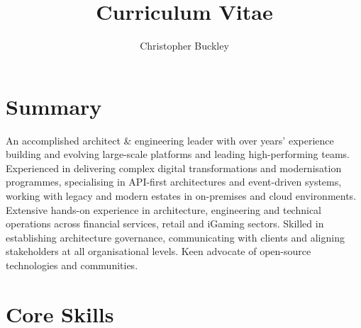 \documentclass{cv}
\title{Curriculum Vitae}
\author{Christopher Buckley}
\begin{document}

\section{Summary}

An accomplished architect \& engineering leader with over  years' experience
building and evolving large-scale platforms and leading high-performing teams. Experienced in
delivering complex digital transformations and modernisation programmes, specialising in API-first
architectures and event-driven systems, working with legacy and modern estates in on-premises and cloud
environments. Extensive hands-on experience in architecture, engineering and technical operations across
financial services, retail and iGaming sectors. Skilled in establishing architecture governance,
communicating with clients and aligning stakeholders at all organisational levels. Keen advocate of
open-source technologies and communities.


\section{Core Skills}
\end{document}
